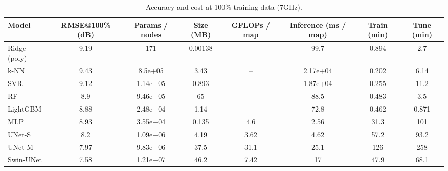 \begin{table}[t]
\centering
\caption{Accuracy and cost at 100\% training data (7GHz).}
\begin{tabular}{lccccccc}
\hline
Model & RMSE@100\% (dB) & Params / nodes & Size (MB) & GFLOPs / map & Inference (ms / map) & Train (min) & Tune (min) \\
\hline
Ridge (poly) & 9.19 & 171 & 0.00138 & -- & 99.7 & 0.894 & 2.7 \\
k-NN & 9.43 & 8.5e+05 & 3.43 & -- & 2.17e+04 & 0.202 & 6.14 \\
SVR & 9.12 & 1.14e+05 & 0.893 & -- & 1.87e+04 & 0.255 & 11.2 \\
RF & 8.9 & 9.46e+05 & 65 & -- & 88.5 & 0.483 & 3.5 \\
LightGBM & 8.88 & 2.48e+04 & 1.14 & -- & 72.8 & 0.462 & 0.871 \\
MLP & 8.93 & 3.55e+04 & 0.135 & 4.6 & 2.56 & 31.3 & 101 \\
UNet-S & 8.2 & 1.09e+06 & 4.19 & 3.62 & 4.62 & 57.2 & 93.2 \\
UNet-M & 7.97 & 9.83e+06 & 37.5 & 31.1 & 25.1 & 126 & 258 \\
Swin-UNet & 7.58 & 1.21e+07 & 46.2 & 7.42 & 17 & 47.9 & 68.1 \\
\hline
\end{tabular}
\end{table}